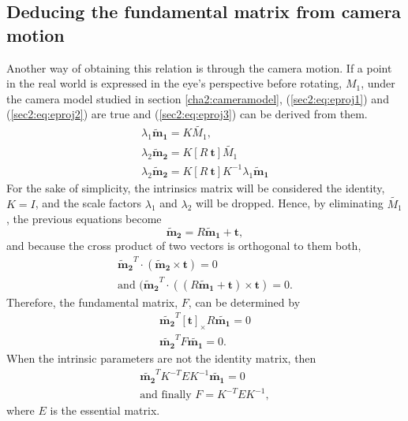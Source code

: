 \subsection{Deducing the fundamental matrix from camera motion}
Another way of obtaining this relation is through the camera motion.
If a point in the real world is expressed in the eye's perspective before rotating, $M_1$, under the camera model studied in section \ref{cha2:cameramodel}, (\ref{sec2:eq:eproj1}) and (\ref{sec2:eq:eproj2}) are true and (\ref{sec2:eq:eproj3}) can be derived from them.
\begin{align}
\label{sec2:eq:eproj1}
\lambda_1 \mathbf{\tilde{m}_1} = K \tilde{M_1}, \\
\label{sec2:eq:eproj2}
\lambda_2 \mathbf{\tilde{m}_2} = K [ R \ \mathbf{t} ] \tilde{M_1}\\
\label{sec2:eq:eproj3}
\lambda_2 \mathbf{\tilde{m}_2} = K [ R \ \mathbf{t} ] K^{-1} \lambda_1 \mathbf{\tilde{m}_1}
\end{align}
For the sake of simplicity, the intrinsics matrix will be considered the identity, $K= I$, and the scale factors $\lambda_1$ and $\lambda_2$ will be dropped. Hence, by eliminating $\tilde{M_1}$, the previous equations become
\begin{equation}
\label{sec2:eq:elimp}
\mathbf{\tilde{m}_2} = R   \mathbf{\tilde{m}_1} + \mathbf{t},
\end{equation}
and because the cross product of two vectors is orthogonal to them both,  
\begin{align}
	\label{sec2:eq:fundm1}
	\mathbf{\tilde{m}_2}^T \cdot ( \mathbf{\tilde{m}_2} \times \mathbf{t}) = 0 \\
	\label{sec2:eq:fundm2}
	\text{and } ( \mathbf{\tilde{m}_2}^T\cdot((R  \mathbf{\tilde{m}_1} + \mathbf{t}) \times \mathbf{t}) = 0.
\end{align}
Therefore, the fundamental matrix, $F$, can be determined by 
\begin{equation}
\label{sec2:eq:fundm3}
\begin{aligned}
\mathbf{\tilde{m_2}}^T [\mathbf{t}]_\times R \mathbf{\tilde{m_1}} = 0 \\
\mathbf{\tilde{m_2}}^T F \mathbf{\tilde{m_1}} = 0.
\end{aligned}
\end{equation}
When the intrinsic parameters are not the identity matrix, then 
\begin{equation}
\begin{aligned}
\label{hhh}
\mathbf{\tilde{m_2}}^T K^{-T} E K^{-1} \mathbf{\tilde{m_1}} = 0 \\
\text{and finally }
F = K^{-T}  E K^{-1},
\end{aligned}
\end{equation}
where $E$ is the essential matrix.

